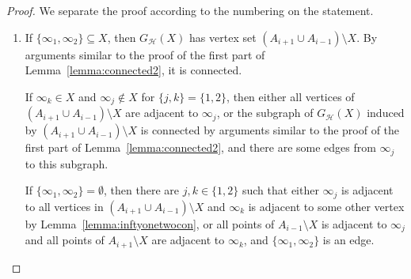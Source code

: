 \documentclass[11pt,a4paper]{article}
\begin{document}
\begin{proof}
We separate the proof according to the numbering on the statement.
\begin{enumerate}
\item If $\{\infty_1,\infty_2\}\subseteq X$, then $G_{\mathcal{H}}(X)$ has vertex set $(A_{i+1} \cup A_{i-1}) \setminus X$. By arguments similar to the proof of the first part of Lemma~\ref{lemma:connected2}, it is connected.

If $\infty_k\in X$ and $\infty_j\not\in X$ for $\{ j,k \} =  \{1,2\}$, then either all vertices of $(A_{i+1} \cup A_{i-1}) \setminus X$ are adjacent to $\infty_j$, or the subgraph of $G_{\mathcal{H}}(X)$ induced by $(A_{i+1} \cup A_{i-1}) \setminus X$ is connected by arguments similar to the proof of the first part of Lemma~\ref{lemma:connected2}, and there are some edges from $\infty_j$ to this subgraph.

If $\{\infty_1,\infty_2\}=\emptyset$, then there are $j,k \in  \{ 1,2 \}$ such that either $\infty_j$ is adjacent to all vertices in $(A_{i+1} \cup A_{i-1}) \setminus X$ and $\infty_k$ is adjacent to some other vertex by Lemma~\ref{lemma:inftyonetwocon}, or all points of $A_{i-1}\setminus X$ is adjacent to $\infty_j$ and all points of $A_{i+1}\setminus X$ are adjacent to $\infty_k$, and $\{\infty_1,\infty_2\}$ is an edge.





\end{enumerate}
\end{proof}
\end{document}
